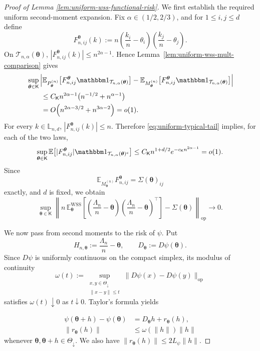 \documentclass{article}
\theoremstyle{named}
\theoremstyle{named1}
\newcommand{\E}{\mathbb{E}}
\newcommand{\WSS}{\mathrm{WSS}}
\newcommand{\btheta}{\boldsymbol{\theta}}
\theoremstyle{plain}
\theoremstyle{remark}
\begin{document}
\begin{proof}[Proof of Lemma \ref{lem:uniform-wss-functional-risk}]
We first establish the required uniform second-moment expansion. Fix
\(\alpha\in(1/2,2/3)\), and for \(1\leq i,j\leq d\) define
\[
    F_{n,ij}^{\btheta}(k)
    :=n\left(\frac{k_i}{n}-\theta_i\right)
       \left(\frac{k_j}{n}-\theta_j\right).
\]
On \(\mathcal T_{n,\alpha}(\btheta)\),
\( |F_{n,ij}^{\btheta}(k)|\leq n^{2\alpha-1}\). Hence
Lemma~\ref{lem:uniform-wss-mult-comparison} gives
\[
\begin{aligned}
&\sup_{\btheta\in\mathsf K}
\left|
 \E_{P_{\btheta}^{(n)}}
 \bigl[F_{n,ij}^{\btheta}\mathbbm1_{\mathcal T_{n,\alpha}(\btheta)}\bigr]
 -\E_{M_{\btheta}^{(n)}}
 \bigl[F_{n,ij}^{\btheta}\mathbbm1_{\mathcal T_{n,\alpha}(\btheta)}\bigr]
\right|\\
&\qquad\leq
 C_{\mathsf K}n^{2\alpha-1}
 \bigl(n^{-1/2}+n^{\alpha-1}\bigr)\\
&\qquad=
 O\!\left(n^{2\alpha-3/2}+n^{3\alpha-2}\right)
 =o(1).
\end{aligned}
\]
For every \(k\in\mathbb L_{n,d}\),
\(|F_{n,ij}^{\btheta}(k)|\leq n\). Therefore
\eqref{eq:uniform-typical-tail} implies, for each of the two laws,
\[
    \sup_{\btheta\in\mathsf K}
    \E\!\left[
      |F_{n,ij}^{\btheta}|
      \mathbbm1_{\mathcal T_{n,\alpha}(\btheta)^c}
    \right]
    \leq
    C_{\mathsf K}n^{1+d/2}
      e^{-c_{\mathsf K}n^{2\alpha-1}}
    =o(1).
\]
Since
\[
    \E_{M_{\btheta}^{(n)}}F_{n,ij}^{\btheta}
    =\Sigma(\btheta)_{ij}
\]
exactly, and \(d\) is fixed, we obtain
\begin{equation}
    \sup_{\btheta\in\mathsf K}
    \left\|
      n\,\E_{\btheta}^{\WSS}
      \left[
        \left(\frac{\Lambda_n}{n}-\btheta\right)
        \left(\frac{\Lambda_n}{n}-\btheta\right)^\top
      \right]
      -\Sigma(\btheta)
    \right\|_{\mathrm{op}}
    \rightarrow0.
\label{eq:uniform-wss-covariance}
\end{equation}

We now pass from second moments to the risk of \(\psi\). Put
\[
    H_{n,\btheta}:=\frac{\Lambda_n}{n}-\btheta,
    \qquad
    D_{\btheta}:=D\psi(\btheta).
\]
Since \(D\psi\) is uniformly continuous on the compact simplex, its
modulus of continuity
\[
    \omega(t)
    :=\sup_{\substack{x,y\in\Theta_{\downarrow}\\
                      \|x-y\|\leq t}}
      \|D\psi(x)-D\psi(y)\|_{\mathrm{op}}
\]
satisfies \(\omega(t)\downarrow0\) as \(t\downarrow0\). Taylor's formula yields

\begin{align}
    \psi(\btheta+h)-\psi(\btheta)
      &=D_{\btheta}h+r_{\btheta}(h),\nonumber\\
    \|r_{\btheta}(h)\|
      &\leq\omega(\|h\|)\|h\|\label{eq:uniform-taylor-remainder}
\end{align}
whenever \(\btheta,\btheta+h\in\Theta_{\downarrow}\). We also have
\(\|r_{\btheta}(h)\|\leq2L_\psi\|h\|\).


\end{proof}
\end{document}

